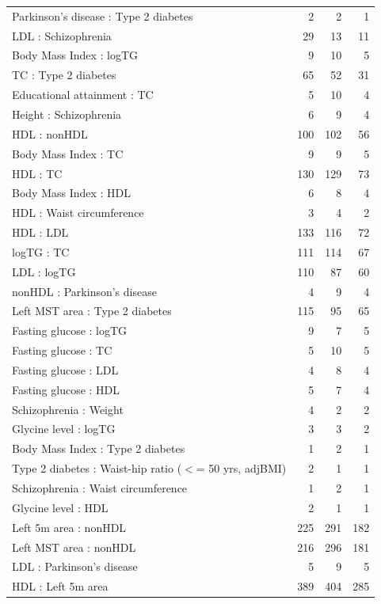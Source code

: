 \begin{table}[ht]
\begin{tabular}{lrrr}
  Parkinson's disease : Type 2 diabetes &   2 &   2 &   1 \\ 
  LDL : Schizophrenia &  29 &  13 &  11 \\ 
  Body Mass Index  : logTG &   9 &  10 &   5 \\ 
  TC : Type 2 diabetes &  65 &  52 &  31 \\ 
  Educational attainment : TC &   5 &  10 &   4 \\ 
  Height  : Schizophrenia &   6 &   9 &   4 \\ 
  HDL : nonHDL & 100 & 102 &  56 \\ 
  Body Mass Index  : TC &   9 &   9 &   5 \\ 
  HDL : TC & 130 & 129 &  73 \\ 
  Body Mass Index  : HDL &   6 &   8 &   4 \\ 
  HDL : Waist circumference  &   3 &   4 &   2 \\ 
  HDL : LDL & 133 & 116 &  72 \\ 
  logTG : TC & 111 & 114 &  67 \\ 
  LDL : logTG & 110 &  87 &  60 \\ 
  nonHDL : Parkinson's disease &   4 &   9 &   4 \\ 
  Left MST area : Type 2 diabetes & 115 &  95 &  65 \\ 
  Fasting glucose : logTG &   9 &   7 &   5 \\ 
  Fasting glucose : TC &   5 &  10 &   5 \\ 
  Fasting glucose : LDL &   4 &   8 &   4 \\ 
  Fasting glucose : HDL &   5 &   7 &   4 \\ 
  Schizophrenia : Weight  &   4 &   2 &   2 \\ 
  Glycine level  : logTG &   3 &   3 &   2 \\ 
  Body Mass Index  : Type 2 diabetes &   1 &   2 &   1 \\ 
  Type 2 diabetes : Waist-hip ratio ($<$= 50 yrs, adjBMI) &   2 &   1 &   1 \\ 
  Schizophrenia : Waist circumference  &   1 &   2 &   1 \\ 
  Glycine level  : HDL &   2 &   1 &   1 \\ 
  Left 5m area : nonHDL & 225 & 291 & 182 \\ 
  Left MST area : nonHDL & 216 & 296 & 181 \\ 
  LDL : Parkinson's disease &   5 &   9 &   5 \\ 
  HDL : Left 5m area & 389 & 404 & 285 \\ 

\end{tabular}
\end{table}
